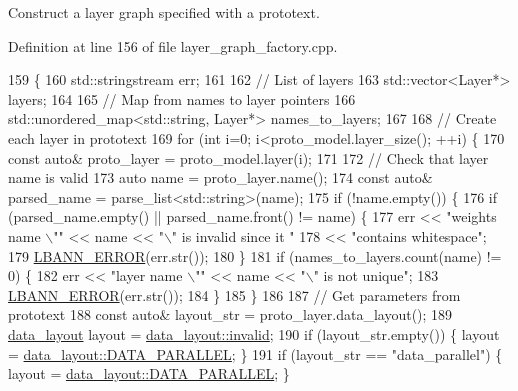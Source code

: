Construct a layer graph specified with a prototext. 

Definition at line 156 of file layer\+\_\+graph\+\_\+factory.\+cpp.


\begin{DoxyCode}
159                                                                               \{
160   std::stringstream err;
161 
162   \textcolor{comment}{// List of layers}
163   std::vector<Layer*> layers;
164 
165   \textcolor{comment}{// Map from names to layer pointers}
166   std::unordered\_map<std::string, Layer*> names\_to\_layers;
167 
168   \textcolor{comment}{// Create each layer in prototext}
169   \textcolor{keywordflow}{for} (\textcolor{keywordtype}{int} i=0; i<proto\_model.layer\_size(); ++i) \{
170     \textcolor{keyword}{const} \textcolor{keyword}{auto}& proto\_layer = proto\_model.layer(i);
171 
172     \textcolor{comment}{// Check that layer name is valid}
173     \textcolor{keyword}{auto} name = proto\_layer.name();
174     \textcolor{keyword}{const} \textcolor{keyword}{auto}& parsed\_name = parse\_list<std::string>(name);
175     \textcolor{keywordflow}{if} (!name.empty()) \{
176       \textcolor{keywordflow}{if} (parsed\_name.empty() || parsed\_name.front() != name) \{
177         err << \textcolor{stringliteral}{"weights name \(\backslash\)""} << name << \textcolor{stringliteral}{"\(\backslash\)" is invalid since it "}
178             << \textcolor{stringliteral}{"contains whitespace"};
179         \hyperlink{base_8hpp_a80b1d707117e968a6951b7222e4b2b87}{LBANN\_ERROR}(err.str());
180       \}
181       \textcolor{keywordflow}{if} (names\_to\_layers.count(name) != 0) \{
182         err << \textcolor{stringliteral}{"layer name \(\backslash\)""} << name << \textcolor{stringliteral}{"\(\backslash\)" is not unique"};
183         \hyperlink{base_8hpp_a80b1d707117e968a6951b7222e4b2b87}{LBANN\_ERROR}(err.str());
184       \}
185     \}
186     
187     \textcolor{comment}{// Get parameters from prototext}
188     \textcolor{keyword}{const} \textcolor{keyword}{auto}& layout\_str = proto\_layer.data\_layout();
189     \hyperlink{base_8hpp_a786677cbfb3f5677b4d84f3056eb08db}{data\_layout} layout = \hyperlink{base_8hpp_a786677cbfb3f5677b4d84f3056eb08dbafedb2d84cafe20862cb4399751a8a7e3}{data\_layout::invalid};
190     \textcolor{keywordflow}{if} (layout\_str.empty())             \{ layout = \hyperlink{base_8hpp_a786677cbfb3f5677b4d84f3056eb08dba37d2a3465f7cbf4ab60f4e79944d0638}{data\_layout::DATA\_PARALLEL}; \}
191     \textcolor{keywordflow}{if} (layout\_str == \textcolor{stringliteral}{"data\_parallel"})  \{ layout = \hyperlink{base_8hpp_a786677cbfb3f5677b4d84f3056eb08dba37d2a3465f7cbf4ab60f4e79944d0638}{data\_layout::DATA\_PARALLEL}; \}

\end{DoxyCode}
